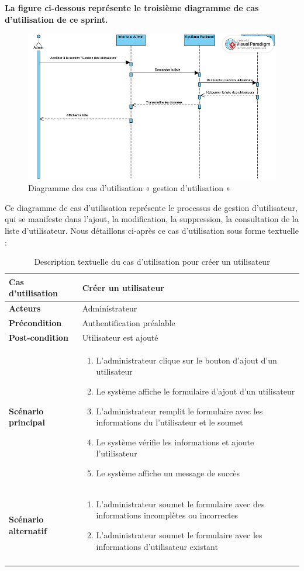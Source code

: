 \textbf{La figure ci-dessous représente le troisième diagramme de cas d'utilisation de ce sprint.}

\begin{figure}[H]
    \centering
    \includegraphics[width=0.6\linewidth]{projet/images/diagramme de sequance/consulter les utilisateurs admin sequnace diagram(1).png}
    \caption{Diagramme des cas d'utilisation « gestion d'utilisation »}
    \label{fig:equipe_scrum}
\end{figure}

Ce diagramme de cas d'utilisation représente le processus de gestion d'utilisateur, qui se manifeste dans l'ajout, la modification, la suppression, la consultation de la liste d'utilisateur. Nous détaillons ci-après ce cas d'utilisation sous forme textuelle :

\begin{longtable}{|>{\bfseries}p{4cm}|p{10cm}|}
\hline
Cas d'utilisation & Créer un utilisateur \\
\hline
Acteurs & Administrateur \\
\hline
Précondition & Authentification préalable \\
\hline
Post-condition & Utilisateur est ajouté \\
\hline
Scénario principal & 
\begin{enumerate}
  \item L'administrateur clique sur le bouton d'ajout d'un utilisateur
  \item Le système affiche le formulaire d'ajout d'un utilisateur
  \item L'administrateur remplit le formulaire avec les informations du l'utilisateur et le soumet
  \item Le système vérifie les informations et ajoute l'utilisateur
  \item Le système affiche un message de succès
\end{enumerate} \\
\hline
Scénario alternatif & 
\begin{enumerate}
  \item L'administrateur soumet le formulaire avec des informations incomplètes ou incorrectes
  \item L'administrateur soumet le formulaire avec les informations d'utilisateur existant
\end{enumerate} \\
\hline
\caption{Description textuelle du cas d'utilisation pour créer un utilisateur}
\end{longtable}

